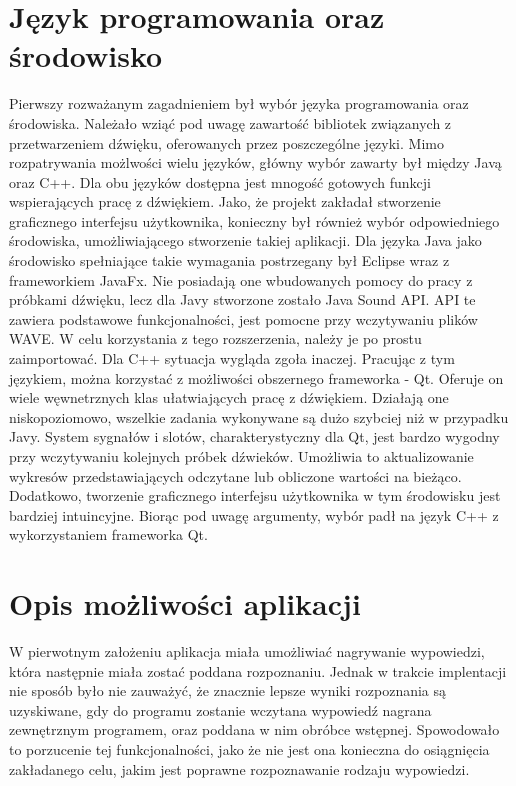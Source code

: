 \documentclass[a4paper,12 pt]{report}
\begin{document}
\section{Język programowania oraz środowisko}
Pierwszy rozważanym zagadnieniem był wybór języka programowania oraz środowiska. Należało wziąć pod uwagę zawartość bibliotek związanych z przetwarzeniem dźwięku, oferowanych przez poszczególne języki.
Mimo rozpatrywania możlwości wielu języków, główny wybór zawarty był między Javą oraz C++. Dla obu języków dostępna jest mnogość gotowych funkcji wspierających pracę z dźwiękiem. Jako, że projekt zakładał stworzenie graficznego interfejsu użytkownika, 
konieczny był również wybór odpowiedniego środowiska, umożliwiającego stworzenie takiej aplikacji. Dla języka Java jako środowisko spełniające takie wymagania postrzegany był Eclipse wraz z frameworkiem JavaFx. Nie posiadają one wbudowanych pomocy do pracy z próbkami dźwięku, lecz dla Javy stworzone zostało
Java Sound API. API te zawiera podstawowe funkcjonalności, jest pomocne przy wczytywaniu plików WAVE. W celu korzystania z tego rozszerzenia, należy je po prostu zaimportować. Dla  C++ sytuacja wygląda zgoła inaczej. Pracując z tym językiem, można korzystać z możliwości obszernego frameworka - Qt. Oferuje on wiele węwnetrznych klas ułatwiających pracę z dźwiękiem. Działają one niskopoziomowo, wszelkie zadania wykonywane są dużo szybciej niż w przypadku Javy.  System sygnałów i slotów, charakterystyczny dla Qt, jest bardzo wygodny przy wczytywaniu kolejnych próbek dźwieków. Umożliwia to aktualizowanie wykresów przedstawiających odczytane lub obliczone wartości na bieżąco. Dodatkowo, tworzenie graficznego interfejsu użytkownika w tym środowisku jest bardziej intuincyjne. Biorąc pod uwagę argumenty, wybór padł na język C++ z wykorzystaniem frameworka Qt.

\section{Opis możliwości aplikacji}
W pierwotnym założeniu aplikacja miała umożliwiać nagrywanie wypowiedzi, która następnie miała zostać poddana rozpoznaniu. Jednak w trakcie implentacji nie sposób było nie zauważyć, że znacznie lepsze wyniki rozpoznania są uzyskiwane, gdy do programu zostanie wczytana wypowiedź nagrana zewnętrznym programem, oraz poddana w nim obróbce wstępnej. Spowodowało to porzucenie tej funkcjonalności, jako że nie jest ona konieczna do osiągnięcia zakładanego celu, jakim jest poprawne rozpoznawanie rodzaju wypowiedzi.
\end{document}
